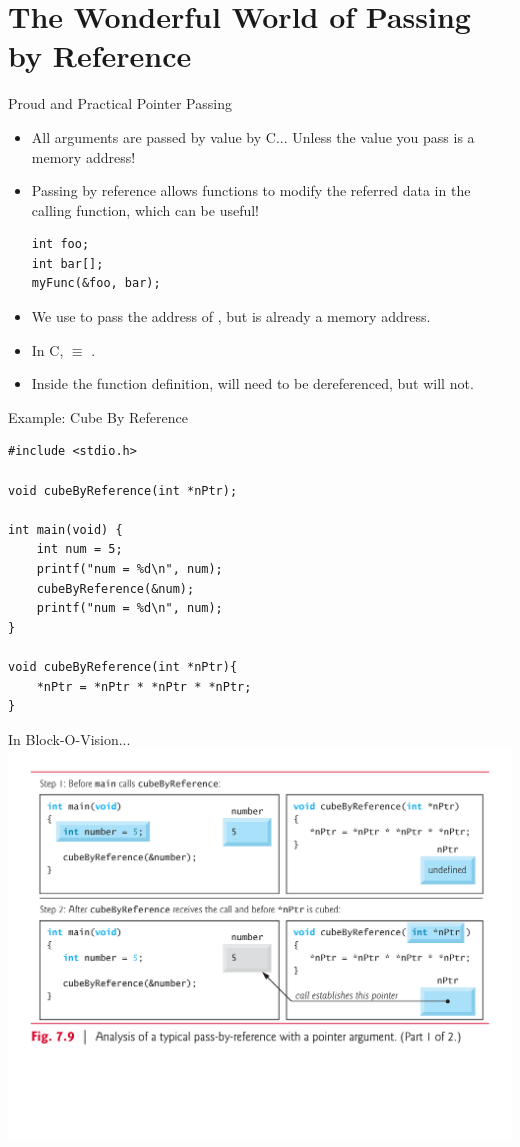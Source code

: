 \documentclass[11pt]{beamer}
\let\OldTexttt\texttt
\renewcommand{\texttt}[1]{\OldTexttt{\color{teal}{#1}}}
\begin{document}
\section[Passing]{The Wonderful World of Passing by Reference}
\begin{frame}[fragile=singleslide]{Proud and Practical Pointer Passing}
\begin{itemize}
\item All arguments are passed by value by C... Unless the value you pass is a memory address!
\item Passing by reference allows functions to modify the referred data in the calling function, which can be useful!
\begin{lstlisting}[style=C]
int foo;
int bar[];
myFunc(&foo, bar);
\end{lstlisting}
\item We use \texttt{\&} to pass the address of \texttt{foo}, but \texttt{bar} is already a memory address.
\item In C, \texttt{someArray} $\equiv$ \texttt{\&someArray[0]}.
\item Inside the function definition, \texttt{foo} will need to be dereferenced, but \texttt{bar} will not.
\end{itemize}
\end{frame}

\begin{frame}[fragile=singleslide]{Example: Cube By Reference}
\begin{lstlisting}[style=C]
#include <stdio.h>

void cubeByReference(int *nPtr);

int main(void) {
	int num = 5;
	printf("num = %d\n", num);
	cubeByReference(&num);
	printf("num = %d\n", num);
}

void cubeByReference(int *nPtr){
	*nPtr = *nPtr * *nPtr * *nPtr;
}
\end{lstlisting}
\end{frame}

\begin{frame}{In Block-O-Vision...}
\center
\includegraphics[scale=0.35]{tbc.png}
\end{frame}
\end{document}
